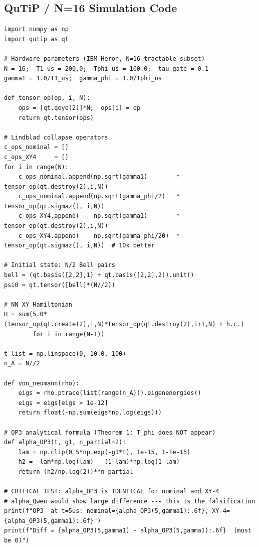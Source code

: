 \documentclass[11pt,letterpaper]{article}
\begin{document}
\subsection{QuTiP / N=16 Simulation Code}

\begin{lstlisting}[caption={N=16 Lindblad simulation --- Theorem 1 falsification test}]
import numpy as np
import qutip as qt

# Hardware parameters (IBM Heron, N=16 tractable subset)
N = 16;  T1_us = 200.0;  Tphi_us = 100.0;  tau_gate = 0.1
gamma1 = 1.0/T1_us;  gamma_phi = 1.0/Tphi_us

def tensor_op(op, i, N):
    ops = [qt.qeye(2)]*N;  ops[i] = op
    return qt.tensor(ops)

# Lindblad collapse operators
c_ops_nominal = []
c_ops_XY4     = []
for i in range(N):
    c_ops_nominal.append(np.sqrt(gamma1)        * tensor_op(qt.destroy(2),i,N))
    c_ops_nominal.append(np.sqrt(gamma_phi/2)   * tensor_op(qt.sigmaz(), i,N))
    c_ops_XY4.append(    np.sqrt(gamma1)        * tensor_op(qt.destroy(2),i,N))
    c_ops_XY4.append(    np.sqrt(gamma_phi/20)  * tensor_op(qt.sigmaz(), i,N))  # 10x better

# Initial state: N/2 Bell pairs
bell = (qt.basis([2,2],1) + qt.basis([2,2],2)).unit()
psi0 = qt.tensor([bell]*(N//2))

# NN XY Hamiltonian
H = sum(5.0*(tensor_op(qt.create(2),i,N)*tensor_op(qt.destroy(2),i+1,N) + h.c.)
        for i in range(N-1))

t_list = np.linspace(0, 10.0, 100)
n_A = N//2

def von_neumann(rho):
    eigs = rho.ptrace(list(range(n_A))).eigenenergies()
    eigs = eigs[eigs > 1e-12]
    return float(-np.sum(eigs*np.log(eigs)))

# OP3 analytical formula (Theorem 1: T_phi does NOT appear)
def alpha_OP3(t, g1, n_partial=2):
    lam = np.clip(0.5*np.exp(-g1*t), 1e-15, 1-1e-15)
    h2 = -lam*np.log(lam) - (1-lam)*np.log(1-lam)
    return (h2/np.log(2))**n_partial

# CRITICAL TEST: alpha_OP3 is IDENTICAL for nominal and XY-4
# alpha_Qwen would show large difference --- this is the falsification
print(f"OP3  at t=5us: nominal={alpha_OP3(5,gamma1):.6f}, XY-4={alpha_OP3(5,gamma1):.6f}")
print(f"Diff = {alpha_OP3(5,gamma1) - alpha_OP3(5,gamma1):.6f}  (must be 0)")
\end{lstlisting}

\newpage
\end{document}
